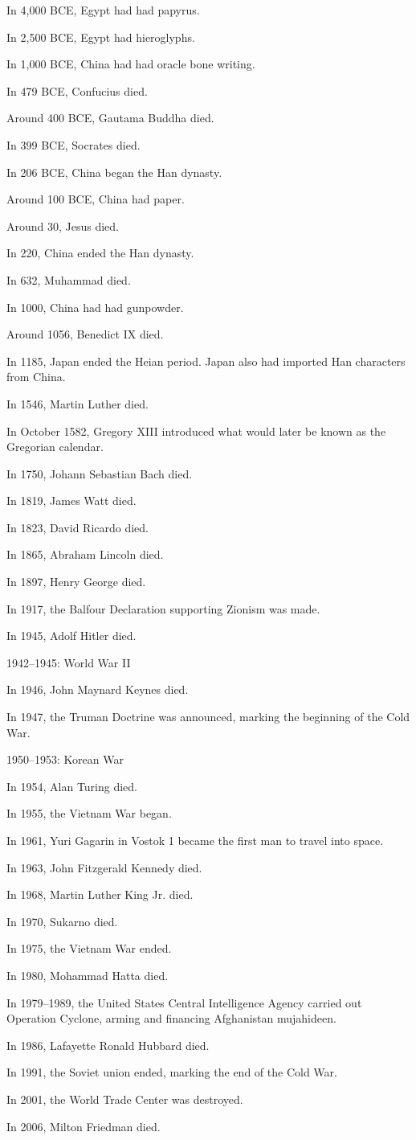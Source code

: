 In 4,000 BCE, Egypt had had papyrus.

In 2,500 BCE, Egypt had hieroglyphs.

In 1,000 BCE, China had had oracle bone writing.

In 479 BCE, Confucius died.

Around 400 BCE, Gautama Buddha died.

In 399 BCE, Socrates died.

In 206 BCE, China began the Han dynasty.

Around 100 BCE, China had paper.

Around 30, Jesus died.

In 220, China ended the Han dynasty.

In 632, Muhammad died.

In 1000, China had had gunpowder.

Around 1056, Benedict IX died.

In 1185, Japan ended the Heian period.
Japan also had imported Han characters from China.

In 1546, Martin Luther died.

In October 1582, Gregory XIII introduced
what would later be known as the Gregorian calendar.

In 1750, Johann Sebastian Bach died.

In 1819, James Watt died.

In 1823, David Ricardo died.

In 1865, Abraham Lincoln died.

In 1897, Henry George died.

In 1917, the Balfour Declaration supporting Zionism was made.

In 1945, Adolf Hitler died.

1942--1945: World War II

In 1946, John Maynard Keynes died.

In 1947, the Truman Doctrine was announced,
marking the beginning of the Cold War.

1950--1953: Korean War

In 1954, Alan Turing died.

In 1955, the Vietnam War began.

In 1961, Yuri Gagarin in Vostok 1
became the first man to travel into space.

In 1963, John Fitzgerald Kennedy died.

In 1968, Martin Luther King Jr. died.

In 1970, Sukarno died.

In 1975, the Vietnam War ended.

In 1980, Mohammad Hatta died.

In 1979--1989, the United States Central Intelligence Agency
carried out Operation Cyclone,
arming and financing Afghanistan mujahideen.

In 1986, Lafayette Ronald Hubbard died.

In 1991, the Soviet union ended, marking the end of the Cold War.

In 2001, the World Trade Center was destroyed.

In 2006, Milton Friedman died.
